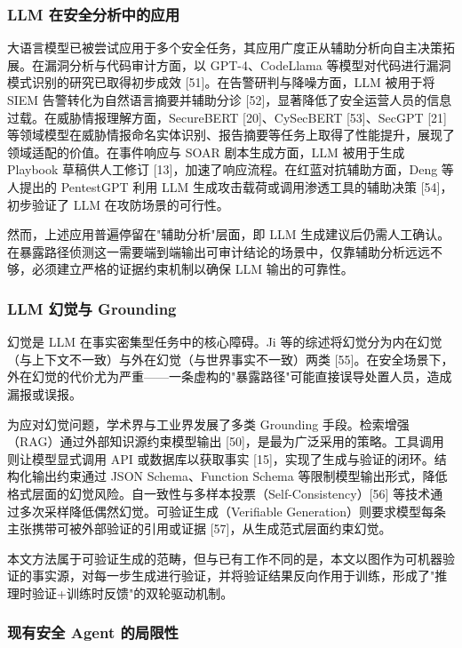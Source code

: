 \documentclass[a4paper,12pt]{ctexart}
\begin{document}
\subsubsection{LLM 在安全分析中的应用}

大语言模型已被尝试应用于多个安全任务，其应用广度正从辅助分析向自主决策拓展。在漏洞分析与代码审计方面，以 GPT-4、CodeLlama 等模型对代码进行漏洞模式识别的研究已取得初步成效 [51]。在告警研判与降噪方面，LLM 被用于将 SIEM 告警转化为自然语言摘要并辅助分诊 [52]，显著降低了安全运营人员的信息过载。在威胁情报理解方面，SecureBERT [20]、CySecBERT [53]、SecGPT [21] 等领域模型在威胁情报命名实体识别、报告摘要等任务上取得了性能提升，展现了领域适配的价值。在事件响应与 SOAR 剧本生成方面，LLM 被用于生成 Playbook 草稿供人工修订 [13]，加速了响应流程。在红蓝对抗辅助方面，Deng 等人提出的 PentestGPT 利用 LLM 生成攻击载荷或调用渗透工具的辅助决策 [54]，初步验证了 LLM 在攻防场景的可行性。

然而，上述应用普遍停留在"辅助分析"层面，即 LLM 生成建议后仍需人工确认。在暴露路径侦测这一需要端到端输出可审计结论的场景中，仅靠辅助分析远远不够，必须建立严格的证据约束机制以确保 LLM 输出的可靠性。

\subsubsection{LLM 幻觉与 Grounding}

幻觉是 LLM 在事实密集型任务中的核心障碍。Ji 等的综述将幻觉分为内在幻觉（与上下文不一致）与外在幻觉（与世界事实不一致）两类 [55]。在安全场景下，外在幻觉的代价尤为严重——一条虚构的"暴露路径"可能直接误导处置人员，造成漏报或误报。

为应对幻觉问题，学术界与工业界发展了多类 Grounding 手段。检索增强（RAG）通过外部知识源约束模型输出 [50]，是最为广泛采用的策略。工具调用则让模型显式调用 API 或数据库以获取事实 [15]，实现了生成与验证的闭环。结构化输出约束通过 JSON Schema、Function Schema 等限制模型输出形式，降低格式层面的幻觉风险。自一致性与多样本投票（Self-Consistency）[56] 等技术通过多次采样降低偶然幻觉。可验证生成（Verifiable Generation）则要求模型每条主张携带可被外部验证的引用或证据 [57]，从生成范式层面约束幻觉。

本文方法属于可验证生成的范畴，但与已有工作不同的是，本文以图作为可机器验证的事实源，对每一步生成进行验证，并将验证结果反向作用于训练，形成了"推理时验证+训练时反馈"的双轮驱动机制。

\subsubsection{现有安全 Agent 的局限性}
\end{document}
